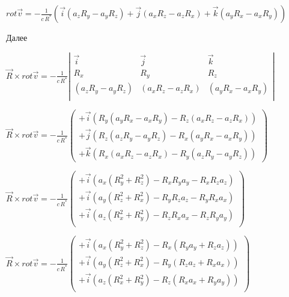 \documentclass[11pt]{article}
\begin{document}
    \(rot \overrightarrow{v}=-\frac{1}{c\,{{R}^{*}}}\left(  \vec i \left(a_z R_y - a_y R_z\right) +  \vec j \left(a_x R_z - a_z R_x\right) +  \vec k \left(a_y R_x - a_x R_y\right)\right)\)

    Далее

\(\vec R \times rot \overrightarrow{v}=-\frac{1}{c\,{{R}^{*}}}\left|\begin{array}{ccc}  \vec i & \vec j & \vec k \\  R_x  & R_y  & R_z \\  \left(a_z R_y - a_y R_z\right)  & \left(a_x R_z - a_z R_x\right)  & \left(a_y R_x - a_x R_y\right)\\ \end{array}\right|\)

    \(\vec R \times rot \overrightarrow{v}=-\frac{1}{c\,{{R}^{*}}}\left(\begin{array}{c}  +\vec i \left( R_y \left(a_y R_x - a_x R_y\right) - R_z \left(a_x R_z - a_z R_x\right) \right) \\  +\vec j \left( R_z \left(a_z R_y - a_y R_z\right) - R_x \left(a_y R_x - a_x R_y\right) \right) \\  +\vec k \left( R_x \left(a_x R_z - a_z R_x\right) - R_y \left(a_z R_y - a_y R_z\right) \right) \end{array}\right)\)

    \(\vec R \times rot \overrightarrow{v}=-\frac{1}{c\,{{R}^{*}}}\left(\begin{array}{c}  +\vec i \left(a_x\left( R_y^2 + R_z^2\right) - R_x R_y a_y - R_x R_z a_z \right) \\  +\vec i \left(a_y\left( R_z^2 + R_x^2\right) - R_y R_z a_z - R_y R_x a_x \right) \\  +\vec i \left(a_z\left( R_x^2 + R_y^2\right) - R_z R_x a_x - R_z R_y a_y \right) \\ \end{array}\right)\)

    \(\vec R \times rot \overrightarrow{v}=-\frac{1}{c\,{{R}^{*}}}\left(\begin{array}{c}  +\vec i \left(a_x\left( R_y^2 + R_z^2\right) - R_x \left(R_y a_y + R_z a_z \right) \right) \\  +\vec i \left(a_y\left( R_z^2 + R_x^2\right) - R_y \left(R_z a_z + R_x a_x \right) \right) \\  +\vec i \left(a_z\left( R_x^2 + R_y^2\right) - R_z \left(R_x a_x + R_y a_y \right) \right) \\ \end{array}\right)\)
\end{document}
